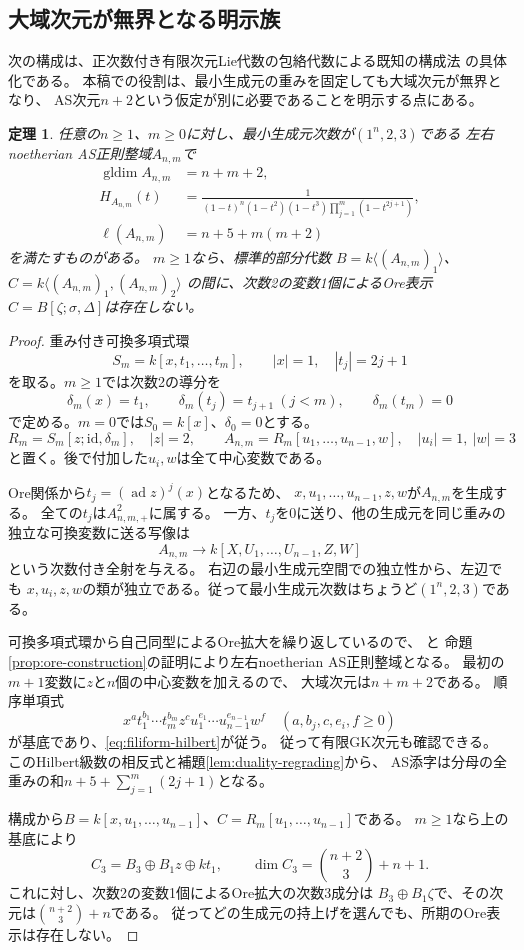 \documentclass[11pt,a4paper]{ltjsarticle}
\newtheorem{theorem}{定理}[section]
\theoremstyle{definition}
\newcommand{\gldim}{\operatorname{gldim}}
\begin{document}
\subsection{大域次元が無界となる明示族}
次の構成は、正次数付き有限次元Lie代数の包絡代数による既知の構成法
\cite[Theorem 2.1]{FVfive}の具体化である。
本稿での役割は、最小生成元の重みを固定しても大域次元が無界となり、
AS次元$n+2$という仮定が別に必要であることを明示する点にある。
\begin{theorem}\label{thm:unbounded-dimension}
任意の$n\geq1$、$m\geq0$に対し、最小生成元次数が$(1^n,2,3)$である
左右noetherian AS正則整域$A_{n,m}$で
\begin{align}
\gldim A_{n,m}&=n+m+2,\label{eq:filiform-dimension}\\
H_{A_{n,m}}(t)&=
\frac1{(1-t)^n(1-t^2)(1-t^3)\prod_{j=1}^m(1-t^{2j+1})},\label{eq:filiform-hilbert}\\
\ell(A_{n,m})&=n+5+m(m+2)\label{eq:filiform-index}
\end{align}
を満たすものがある。
$m\geq1$なら、標準的部分代数
$B=k\langle(A_{n,m})_1\rangle$、
$C=k\langle(A_{n,m})_1,(A_{n,m})_2\rangle$
の間に、次数2の変数1個によるOre表示$C=B[\zeta;\sigma,\Delta]$は存在しない。
\end{theorem}

\begin{proof}
重み付き可換多項式環
\[
S_m=k[x,t_1,\ldots,t_m],\qquad |x|=1,\quad |t_j|=2j+1
\]
を取る。$m\geq1$では次数2の導分を
\[
\delta_m(x)=t_1,\qquad
\delta_m(t_j)=t_{j+1}\ (j<m),\qquad
\delta_m(t_m)=0
\]
で定める。$m=0$では$S_0=k[x]$、$\delta_0=0$とする。
\[
R_m=S_m[z;\mathrm{id},\delta_m],\quad |z|=2,\qquad
A_{n,m}=R_m[u_1,\ldots,u_{n-1},w],
\quad |u_i|=1,\ |w|=3
\]
と置く。後で付加した$u_i,w$は全て中心変数である。

Ore関係から$t_j=(\operatorname{ad}z)^j(x)$となるため、
$x,u_1,\ldots,u_{n-1},z,w$が$A_{n,m}$を生成する。
全ての$t_j$は$A_{n,m,+}^2$に属する。
一方、$t_j$を0に送り、他の生成元を同じ重みの独立な可換変数に送る写像は
\[
A_{n,m}\longrightarrow k[X,U_1,\ldots,U_{n-1},Z,W]
\]
という次数付き全射を与える。
右辺の最小生成元空間での独立性から、左辺でも
$x,u_i,z,w$の類が独立である。従って最小生成元次数はちょうど$(1^n,2,3)$である。

可換多項式環から自己同型によるOre拡大を繰り返しているので、
\cite[\S1.2, \S1.3, Theorem 3.3]{LWW}と
命題\ref{prop:ore-construction}の証明により左右noetherian AS正則整域となる。
最初の$m+1$変数に$z$と$n$個の中心変数を加えるので、
大域次元は$n+m+2$である。
順序単項式
\[
x^a t_1^{b_1}\cdots t_m^{b_m}z^c
u_1^{e_1}\cdots u_{n-1}^{e_{n-1}}w^f
\quad(a,b_j,c,e_i,f\geq0)
\]
が基底であり、\eqref{eq:filiform-hilbert}が従う。
従って有限GK次元も確認できる。
このHilbert級数の相反式と補題\ref{lem:duality-regrading}から、
AS添字は分母の全重みの和$n+5+\sum_{j=1}^m(2j+1)$となる。

構成から$B=k[x,u_1,\ldots,u_{n-1}]$、$C=R_m[u_1,\ldots,u_{n-1}]$である。
$m\geq1$なら上の基底により
\[
C_3=B_3\oplus B_1z\oplus kt_1,\qquad
\dim C_3=\binom{n+2}{3}+n+1.
\]
これに対し、次数2の変数1個によるOre拡大の次数3成分は
$B_3\oplus B_1\zeta$で、その次元は$\binom{n+2}{3}+n$である。
従ってどの生成元の持上げを選んでも、所期のOre表示は存在しない。
\end{proof}
\end{document}
